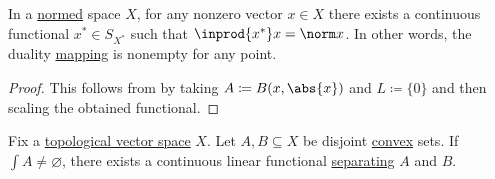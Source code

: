 \begin{corollary}\label{thm:hahn_banach_implies_duality_mapping_nonempty}\mcite\cite[25]{ЙоффеТихомиров1974}
  In a \hyperref[def:norm]{normed} space \( X \), for any nonzero vector \( x \in X \) there exists a continuous functional \( x^* \in S_{X^*} \) such that \( \inprod {x^*} x = \norm x \). In other words, the duality \hyperref[def:duality_mapping]{mapping} is nonempty for any point.
\end{corollary}
\begin{proof}
  This follows from  by taking \( A \coloneqq B(x, \abs{x}) \) and \( L \coloneqq \{ 0 \} \) and then scaling the obtained functional.
\end{proof}

\begin{theorem}\label{thm:hahn_banach_hyperplane_separation}\mcite\cite[25]{ЙоффеТихомиров1974}
  Fix a \hyperref[def:topological_vector_space]{topological vector space} \( X \). Let \( A, B \subseteq X \) be disjoint \hyperref[def:convex_set]{convex} sets. If \( \int{A} \neq \varnothing \), there exists a continuous linear functional \hyperref[def:hyperplane_separation]{separating} \( A \) and \( B \).
\end{theorem}

